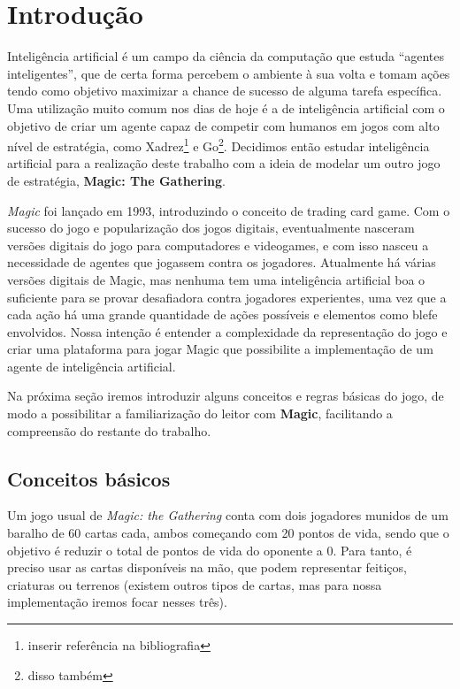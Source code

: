 \chapter{Introdução}

Inteligência artificial é um campo da ciência da computação que estuda
``agentes inteligentes'', que de certa forma percebem o ambiente à sua volta
e tomam ações tendo como objetivo maximizar a chance de sucesso de alguma
tarefa específica. Uma utilização muito comum nos dias de hoje é a de
inteligência artificial com o objetivo de criar um agente capaz de competir
com humanos em jogos com alto nível de estratégia, como Xadrez\footnote{inserir referência
na bibliografia} e Go\footnote{disso também}.
Decidimos então estudar inteligência artificial para a realização deste
trabalho com a ideia de modelar um outro jogo de estratégia,
\textbf{Magic: The Gathering}.

\textit{Magic} foi lançado em 1993, introduzindo o conceito de trading card
game. Com o sucesso do jogo e popularização dos jogos digitais, eventualmente
nasceram versões digitais do jogo para computadores e videogames, e com isso
nasceu a necessidade de agentes que jogassem contra os jogadores. Atualmente
há várias versões digitais de Magic, mas nenhuma tem uma inteligência artificial
boa o suficiente para se provar desafiadora contra jogadores experientes, uma vez
que a cada ação há uma grande quantidade de ações possíveis e elementos como
blefe envolvidos. Nossa intenção é entender a complexidade da representação do
jogo e criar uma plataforma para jogar Magic que possibilite a implementação de
um agente de inteligência artificial.

Na próxima seção iremos introduzir alguns conceitos e regras básicas do jogo,
de modo a possibilitar a familiarização do leitor com \textbf{Magic}, facilitando
a compreensão do restante do trabalho.

\section{Conceitos básicos}
Um jogo usual de \textit{Magic: the Gathering} conta com dois jogadores munidos
de um baralho de 60 cartas cada, ambos começando com 20 pontos de vida, sendo
que o objetivo é reduzir o total de pontos de vida do oponente a 0. Para tanto,
é preciso usar as cartas disponíveis na mão, que podem representar feitiços,
criaturas ou terrenos (existem outros tipos de cartas, mas para nossa implementação
iremos focar nesses três).

